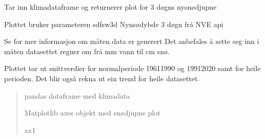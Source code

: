 \documentclass[letterpaper,10pt,norsk]{sphinxmanual}
\begin{document}
\begin{fulllineitems}
\label{\detokenize{index:klimadata.plot.nysnodjupne_3d}}
\pysigstartsignatures
{}
\pysigstopsignatures
\sphinxAtStartPar
Tar inn klimadataframe og returnerer plot for 3 døgns nysnødjupne

\sphinxAtStartPar
Plottet bruker parameteren sdfsw3d \sphinxhyphen{} Nynsødybde 3 døgn frå NVE api

\sphinxAtStartPar
Se  for mer informasjon om måten data er generert
Det anbefales å sette seg inn i måten datasettet regner om frå mm vann til cm snø.

\sphinxAtStartPar
Plottet tar ut snittverdier for normalperiode 1961\sphinxhyphen{}1990 og 1991\sphinxhyphen{}2020 samt for heile perioden.
Det blir også rekna ut ein trend for heile datasettet.
\begin{quote}\begin{description}
\sphinxAtStartPar
{} \textendash{} pandas dataframe med klimadata

\sphinxAtStartPar
Matplotlib axes objekt med snødjupne plot

\sphinxAtStartPar
ax1

\end{description}\end{quote}

\end{fulllineitems}

\end{document}
